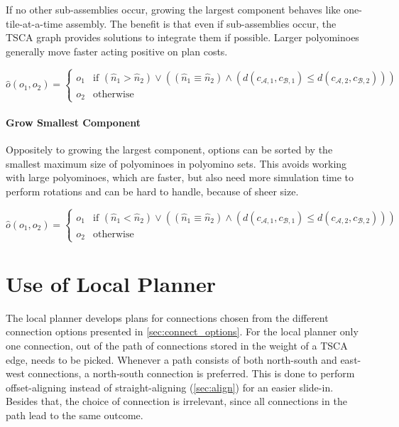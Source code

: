 If no other sub-assemblies occur, growing the largest component behaves like one-tile-at-a-time assembly.
The benefit is that even if sub-assemblies occur, the TSCA graph provides solutions to integrate them if possible.
Larger polyominoes generally move faster acting positive on plan costs.

\begin{equation}
\hat{o}(o_1, o_2) =
\begin{cases}
o_1 & \text{if } \left( \hat{n}_1 > \hat{n}_2 \right) \lor \left( \left( \hat{n}_1 \equiv \hat{n}_2 \right) \land \left( d(c_{\mathcal{A},1}, c_{\mathcal{B},1}) \leq d(c_{\mathcal{A},2}, c_{\mathcal{B},2})\right)\right) \\
o_2 & \text{otherwise}
\end{cases}
\end{equation}

\paragraph{Grow Smallest Component}

Oppositely to growing the largest component, options can be sorted by the smallest maximum size of polyominoes in polyomino sets.
This avoids working with large polyominoes, which are faster, but also need more simulation time to perform rotations and can be hard to handle, because of sheer size.

\begin{equation}
\hat{o}(o_1, o_2) =
\begin{cases}
o_1 & \text{if } \left( \hat{n}_1 < \hat{n}_2 \right) \lor \left( \left( \hat{n}_1 \equiv \hat{n}_2 \right) \land \left( d(c_{\mathcal{A},1}, c_{\mathcal{B},1}) \leq d(c_{\mathcal{A},2}, c_{\mathcal{B},2})\right)\right) \\
o_2 & \text{otherwise}
\end{cases}
\end{equation}

\section{Use of Local Planner}
\label{sec:local_in_global}

The local planner develops plans for connections chosen from the different connection options presented in \autoref{sec:connect_options}.
For the local planner only one connection, out of the path of connections stored in the weight of a TSCA edge, needs to be picked.
Whenever a path consists of both north-south and east-west connections, a north-south connection is preferred.
This is done to perform offset-aligning instead of straight-aligning (\autoref{sec:align}) for an easier slide-in.
Besides that, the choice of connection is irrelevant, since all connections in the path lead to the same outcome.

